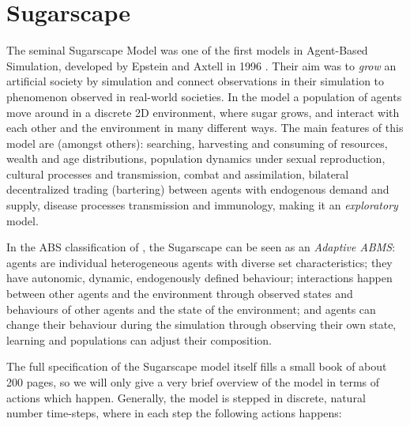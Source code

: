 \section{Sugarscape}
The seminal Sugarscape Model was one of the first models in Agent-Based Simulation, developed by Epstein and Axtell in 1996 \cite{epstein_growing_1996}. Their aim was to \textit{grow} an artificial society by simulation and connect observations in their simulation to phenomenon observed in real-world societies. In the model a population of agents move around in a discrete 2D environment, where sugar grows, and interact with each other and the environment in many different ways. The main features of this model are (amongst others): searching, harvesting and consuming of resources, wealth and age distributions, population dynamics under sexual reproduction, cultural processes and transmission, combat and assimilation, bilateral decentralized trading (bartering) between agents with endogenous demand and supply, disease processes transmission and immunology, making it an \textit{exploratory} model.

In the ABS classification of \cite{macal_everything_2016}, the Sugarscape can be seen as an \textit{Adaptive ABMS}: agents are individual heterogeneous agents with diverse set characteristics; they have autonomic, dynamic, endogenously defined behaviour; interactions happen between other agents and the environment through observed states and behaviours of other agents and the state of the environment; and agents can change their behaviour during the simulation through observing their own state, learning and populations can adjust their composition.

The full specification of the Sugarscape model itself fills a small book \cite{epstein_growing_1996} of about 200 pages, so we will only give a very brief overview of the model in terms of actions which happen. Generally, the model is stepped in discrete, natural number time-steps, where in each step the following actions happens:

